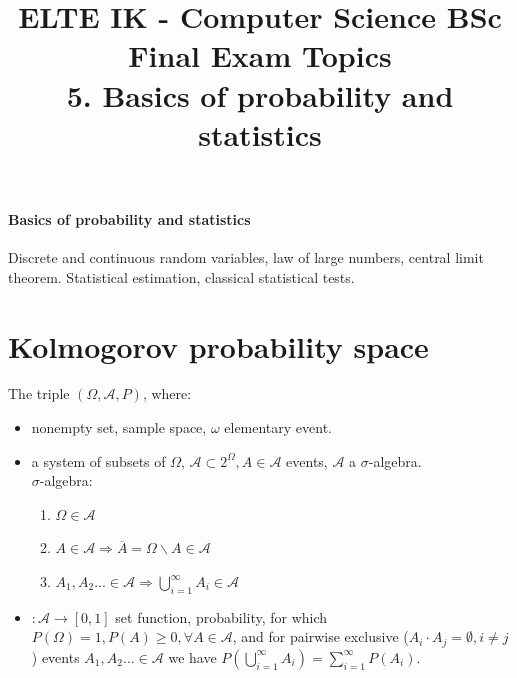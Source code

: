 \documentclass[margin=0px]{article}
\title{\textbf{{\Large ELTE IK - Computer Science BSc} \vspace{0.2cm} \\ {\huge Final Exam Topics}} \vspace{0.3cm} \\ 5. Basics of probability and statistics}
\author{}
\date{}
\newenvironment{tetel}[1]{\paragraph{#1 \\}}{}
\begin{document}
\maketitle

\begin{center}
\end{center}

\begin{tetel}{Basics of probability and statistics}
    Discrete and continuous random variables, law of large numbers, central limit theorem. Statistical estimation, classical statistical tests.
\end{tetel}

\section{Kolmogorov probability space}

The triple $(\Omega, \mathcal{A}, P)$, where:
\begin{itemize}
    \item [$\Omega$] nonempty set, sample space, $\omega$ elementary event.
    \item [$\mathcal{A}$] a system of subsets of $\Omega$, $\mathcal{A} \subset 2^{\Omega}, A \in \mathcal{A}$ events, $\mathcal{A}$ a $\sigma$-algebra. \\
          $\sigma$-algebra:
          \begin{enumerate}
              \item $\Omega \in \mathcal{A}$
              \item $A \in \mathcal{A} \Rightarrow \overline{A} = \Omega \backslash A \in \mathcal{A}$
              \item $A_{1}, A_{2}... \in \mathcal{A} \Rightarrow \bigcup_{i=1}^{\infty}{A_{i}} \in \mathcal{A}$
          \end{enumerate}
    \item [$P$] $: \mathcal{A} \to [0,1]$ set function, probability, for which $P(\Omega) = 1, P(A) \geq 0, \forall A \in \mathcal{A}$, and for pairwise exclusive ($A_{i} \cdot A_{j} = \emptyset, i \neq j$) events $A_{1}, A_{2}... \in \mathcal{A}$ we have $P(\bigcup_{i=1}^{\infty}{A_{i}}) = \sum_{i=1}^{\infty}{P(A_{i})}$.
\end{itemize}
\end{document}
